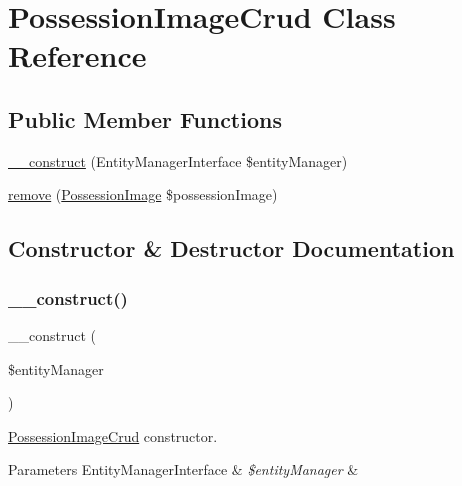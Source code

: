 \hypertarget{class_app_1_1_d_a_l_1_1_possession_image_crud}{}\section{Possession\+Image\+Crud Class Reference}
\label{class_app_1_1_d_a_l_1_1_possession_image_crud}
\subsection*{Public Member Functions}
\begin{DoxyCompactItemize}
\item 
\mbox{\hyperlink{class_app_1_1_d_a_l_1_1_possession_image_crud_abb5fb9a65dd8a81e7482dddbf71c5177}{\+\_\+\+\_\+construct}} (Entity\+Manager\+Interface \$entity\+Manager)
\item 
\mbox{\hyperlink{class_app_1_1_d_a_l_1_1_possession_image_crud_a4394e14f5a6ea86ad422eb0ab8a8968b}{remove}} (\mbox{\hyperlink{class_app_1_1_entity_1_1_possession_image}{Possession\+Image}} \$possession\+Image)
\end{DoxyCompactItemize}


\subsection{Constructor \& Destructor Documentation}
\mbox{\label{class_app_1_1_d_a_l_1_1_possession_image_crud_abb5fb9a65dd8a81e7482dddbf71c5177}} 
\subsubsection{\texorpdfstring{\_\_construct()}{\_\_construct()}}
{\footnotesize\ttfamily \+\_\+\+\_\+construct (\begin{DoxyParamCaption}\item[{Entity\+Manager\+Interface}]{\$entity\+Manager }\end{DoxyParamCaption})}

\mbox{\hyperlink{class_app_1_1_d_a_l_1_1_possession_image_crud}{Possession\+Image\+Crud}} constructor. 
\begin{DoxyParams}[1]{Parameters}
Entity\+Manager\+Interface & {\em \$entity\+Manager} & \\
\hline
\end{DoxyParams}


